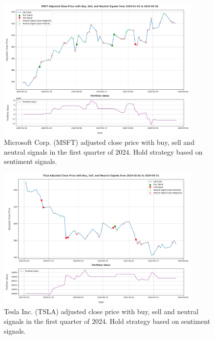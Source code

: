 \begin{figure}[ht]
  \centering
  \includegraphics[width=0.9\textwidth]{img/experiment-stock/msft-hold-strategy-neutral-a.pdf}
  \caption{Microsoft Corp. (MSFT) adjusted close price with buy, sell and neutral signals in the first quarter of 2024. Hold strategy based on sentiment signals.}
  \label{fig:elsa-experiment-stock-msft-hold-strategy-neutral}
\end{figure}

\clearpage
\begin{figure}[ht]
  \centering
  \includegraphics[width=0.9\textwidth]{img/experiment-stock/tsla-hold-strategy-neutral-a.pdf}
  \caption{Tesla Inc. (TSLA) adjusted close price with buy, sell and neutral signals in the first quarter of 2024. Hold strategy based on sentiment signals.}
  \label{fig:elsa-experiment-stock-tsla-hold-strategy-neutral}
\end{figure}

\clearpage

